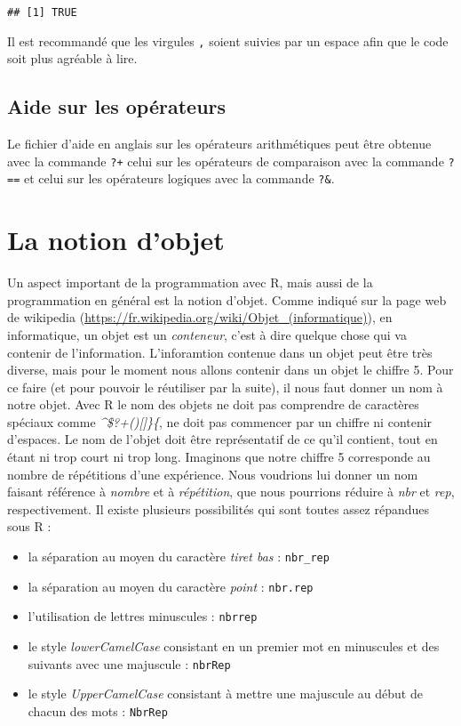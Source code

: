 \documentclass[]{book}
\providecommand{\tightlist}{%
  \setlength{\itemsep}{0pt}\setlength{\parskip}{0pt}}
\theoremstyle{definition}
\theoremstyle{definition}
\theoremstyle{definition}
\theoremstyle{remark}
\begin{document}
\begin{verbatim}
## [1] TRUE
\end{verbatim}

Il est recommandé que les virgules \texttt{,} soient suivies par un
espace afin que le code soit plus agréable à lire.

\subsection{Aide sur les opérateurs}\label{aide-sur-les-operateurs}

Le fichier d'aide en anglais sur les opérateurs arithmétiques peut être
obtenue avec la commande \texttt{?\textquotesingle{}+\textquotesingle{}}
celui sur les opérateurs de comparaison avec la commande
\texttt{?\textquotesingle{}==\textquotesingle{}} et celui sur les
opérateurs logiques avec la commande
\texttt{?\textquotesingle{}\&\textquotesingle{}}.

\hypertarget{l011object}{\section{La notion d'objet}\label{l011object}}

Un aspect important de la programmation avec R, mais aussi de la
programmation en général est la notion d'objet. Comme indiqué sur la
page web de wikipedia
(\url{https://fr.wikipedia.org/wiki/Objet_(informatique)}), en
informatique, un objet est un \emph{conteneur}, c'est à dire quelque
chose qui va contenir de l'information. L'inforamtion contenue dans un
objet peut être très diverse, mais pour le moment nous allons contenir
dans un objet le chiffre 5. Pour ce faire (et pour pouvoir le réutiliser
par la suite), il nous faut donner un nom à notre objet. Avec R le nom
des objets ne doit pas comprendre de caractères spéciaux comme
\emph{\^{}\$?\textbar{}+(){[}{]}\}\{}, ne doit pas commencer par un
chiffre ni contenir d'espaces. Le nom de l'objet doit être représentatif
de ce qu'il contient, tout en étant ni trop court ni trop long.
Imaginons que notre chiffre 5 corresponde au nombre de répétitions d'une
expérience. Nous voudrions lui donner un nom faisant référence à
\emph{nombre} et à \emph{répétition}, que nous pourrions réduire à
\emph{nbr} et \emph{rep}, respectivement. Il existe plusieurs
possibilités qui sont toutes assez répandues sous R :

\begin{itemize}
\tightlist
\item
  la séparation au moyen du caractère \emph{tiret bas} :
  \texttt{nbr\_rep}
\item
  la séparation au moyen du caractère \emph{point} : \texttt{nbr.rep}
\item
  l'utilisation de lettres minuscules : \texttt{nbrrep}
\item
  le style \emph{lowerCamelCase} consistant en un premier mot en
  minuscules et des suivants avec une majuscule : \texttt{nbrRep}
\item
  le style \emph{UpperCamelCase} consistant à mettre une majuscule au
  début de chacun des mots : \texttt{NbrRep}
\end{itemize}
\end{document}
